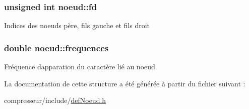 \subsubsection[{\texorpdfstring{fd}{fd}}]{\setlength{\rightskip}{0pt plus 5cm}unsigned int noeud\+::fd}\hypertarget{structnoeud_a72ced58e381fdf4144d295884dcd7168}{}\label{structnoeud_a72ced58e381fdf4144d295884dcd7168}
Indices des noeuds père, fils gauche et fils droit 
\subsubsection[{\texorpdfstring{frequences}{frequences}}]{\setlength{\rightskip}{0pt plus 5cm}double noeud\+::frequences}\hypertarget{structnoeud_a27b27306f715b45b8f8e47bb35ad3859}{}\label{structnoeud_a27b27306f715b45b8f8e47bb35ad3859}
Fréquence d\textquotesingle{}apparation du caractère lié au noeud 

La documentation de cette structure a été générée à partir du fichier suivant \+:\begin{DoxyCompactItemize}
\item 
compresseur/include/\hyperlink{compresseur_2include_2defNoeud_8h}{def\+Noeud.\+h}\end{DoxyCompactItemize}
